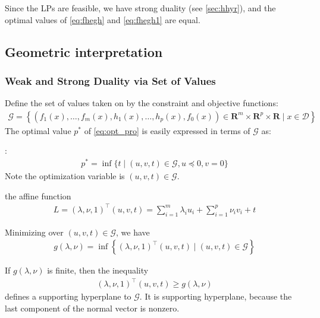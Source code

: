 \documentclass{article}
\begin{document}
Since the LPs are feasible, we have strong duality (see  \cref{sec:hhyr}), and the optimal values of \cref{eq:fhegh} and \cref{eq:fhegh1} are equal.


\subsection{Geometric interpretation}
\subsubsection{Weak and Strong Duality via Set of Values}
Define the set of values taken on by the constraint and objective functions: 
\begin{align*}
\mathcal{G}=\left\{\left(f_{1}(x), \ldots, f_{m}(x), h_{1}(x), \ldots, h_{p}(x), f_{0}(x)\right) \in \mathbf{R}^{m} \times \mathbf{R}^{p} \times \mathbf{R} \mid x \in \mathcal{D}\right\}
\end{align*}
The optimal value $p^* $ of \cref{eq:opt_pro} is easily expressed in terms of $\mathcal{G}$ as:

:
\begin{align*}
p^* =\inf \{t \mid(u, v, t) \in \mathcal{G}, u \preceq 0, v=0\}
\end{align*}
Note the optimization variable is  $(u, v, t) \in \mathcal{G}$.

  the affine function
\begin{align*}
L = (\lambda, \nu, 1)^{\top}(u, v, t)=\sum_{i=1}^{m} \lambda_{i} u_{i}+\sum_{i=1}^{p} \nu_{i} v_{i}+t
\end{align*}

Minimizing over $(u, v, t) \in \mathcal{G}$, we have
\begin{align*}
g(\lambda, \nu)=\inf \left\{(\lambda, \nu, 1)^{\top}(u, v, t) \mid(u, v, t) \in \mathcal{G}\right\}
\end{align*}

If $g(\lambda, \nu)$ is finite, then the inequality
\begin{align*}
(\lambda, \nu, 1)^{\top}(u, v, t) \geq g(\lambda, \nu)
\end{align*}
defines a supporting hyperplane to $\mathcal{G}$. It is  supporting hyperplane, because the last component of the normal vector is nonzero.

\end{document}
